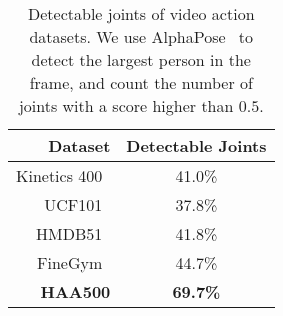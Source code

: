 \documentclass[10pt,twocolumn,letterpaper]{article}
\begin{document}
\begin{table}
\begin{center}
{\small 
\begin{tabular}{r|c}
\hline 
Dataset                         & Detectable Joints            \\ \hline
Kinetics 400~\cite{kinetics400} &         41.0\%               \\ \hline
UCF101~\cite{ucf101}            &         37.8\%               \\ \hline
HMDB51~\cite{HMDB51}            &         41.8\%               \\ \hline
FineGym~\cite{finegym}          &         44.7\%               \\ \hline
\textbf{HAA500}                 & \textbf{69.7\%}              \\ \hline
\end{tabular}
}
\end{center}
\caption{Detectable joints of video action datasets. We use AlphaPose~\cite{alphapose} to detect the largest person in the frame, and count the number of joints with a score higher than $0.5$. }
\label{table:comparison_joint}
\vspace{-1.5em}
\end{table}
\end{document}
